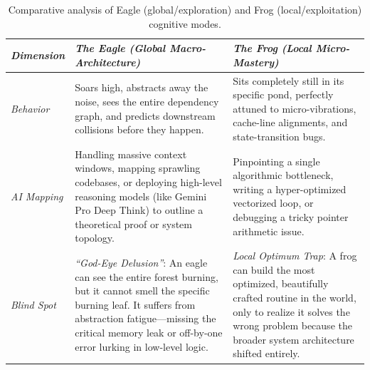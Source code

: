 \documentclass{article}
\begin{document}
\begin{table}[H]
	\centering
	\small
	\begin{tabularx}{\textwidth}{|p{2.5cm}|X|X|}
		\hline
		\emph{Dimension} & \emph{The Eagle (Global Macro-Architecture)} & \emph{The Frog (Local Micro-Mastery)} \\ \hline
		\emph{Behavior} & Soars high, abstracts away the noise, sees the entire dependency graph, and predicts downstream collisions before they happen. & Sits completely still in its specific pond, perfectly attuned to micro-vibrations, cache-line alignments, and state-transition bugs. \\ \hline
		\emph{AI Mapping} & Handling massive context windows, mapping sprawling codebases, or deploying high-level reasoning models (like Gemini Pro Deep Think) to outline a theoretical proof or system topology. & Pinpointing a single algorithmic bottleneck, writing a hyper-optimized vectorized loop, or debugging a tricky pointer arithmetic issue. \\ \hline
		\emph{Blind Spot} & \textit{``God-Eye Delusion''}: An eagle can see the entire forest burning, but it cannot smell the specific burning leaf. It suffers from abstraction fatigue---missing the critical memory leak or off-by-one error lurking in low-level logic. & \textit{Local Optimum Trap}: A frog can build the most optimized, beautifully crafted routine in the world, only to realize it solves the wrong problem because the broader system architecture shifted entirely. \\ \hline
	\end{tabularx}
	\caption{Comparative analysis of Eagle (global/exploration) and Frog (local/exploitation) cognitive modes.}
\end{table}
\end{document}
